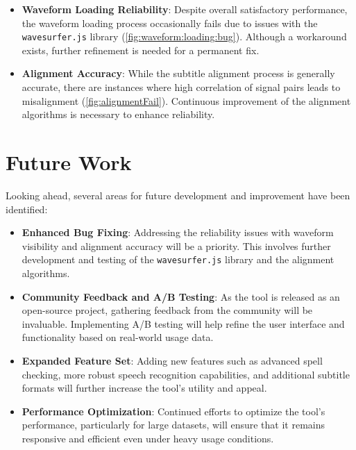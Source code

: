 \begin{itemize}
    \item \textbf{Waveform Loading Reliability}: Despite overall satisfactory performance, the waveform loading process occasionally fails due to issues with the \texttt{wavesurfer.js} library (\ref{fig:waveform:loading:bug}). Although a workaround exists, further refinement is needed for a permanent fix.

    \item \textbf{Alignment Accuracy}: While the subtitle alignment process is generally accurate, there are instances where high correlation of signal pairs leads to misalignment (\ref{fig:alignmentFail}). Continuous improvement of the alignment algorithms is necessary to enhance reliability.
\end{itemize}

\section{Future Work}

Looking ahead, several areas for future development and improvement have been identified:

\begin{itemize}
    \item \textbf{Enhanced Bug Fixing}: Addressing the reliability issues with waveform visibility and alignment accuracy will be a priority. This involves further development and testing of the \texttt{wavesurfer.js} library and the alignment algorithms.

    \item \textbf{Community Feedback and A/B Testing}: As the tool is released as an open-source project, gathering feedback from the community will be invaluable. Implementing A/B testing will help refine the user interface and functionality based on real-world usage data.

    \item \textbf{Expanded Feature Set}: Adding new features such as advanced spell checking, more robust speech recognition capabilities, and additional subtitle formats will further increase the tool's utility and appeal.

    \item \textbf{Performance Optimization}: Continued efforts to optimize the tool's performance, particularly for large datasets, will ensure that it remains responsive and efficient even under heavy usage conditions.
\end{itemize}

